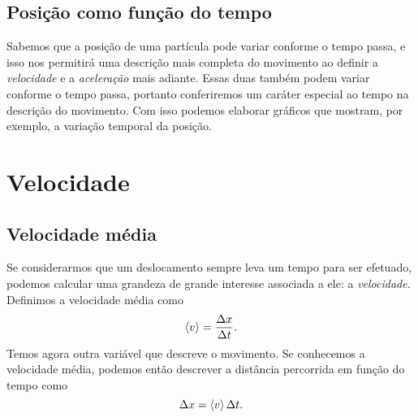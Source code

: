 
\subsection{Posição como função do tempo}

Sabemos que a posição de uma partícula pode variar conforme o tempo passa, e isso nos permitirá uma descrição mais completa do movimento ao definir a \emph{velocidade} e a \emph{aceleração} mais adiante. Essas duas também podem variar conforme o tempo passa, portanto conferiremos um caráter especial ao tempo na descrição do movimento. Com isso podemos elaborar gráficos que mostram, por exemplo, a variação temporal da posição.


\section{Velocidade}

\subsection{Velocidade média}

Se considerarmos que um deslocamento sempre leva um tempo para ser efetuado, podemos calcular uma grandeza de grande interesse associada a ele: a \emph{velocidade}. Definimos a velocidade média como
\begin{equation}
  \left\langle{v}\right\rangle = \frac{\Delta x}{\Delta t}.
\end{equation}
%
Temos agora outra variável que descreve o movimento. Se conhecemos a velocidade média, podemos então descrever a distância percorrida em função do tempo como
\begin{equation}
  \Delta x = \left\langle{v}\right\rangle \Delta t.
\end{equation}


